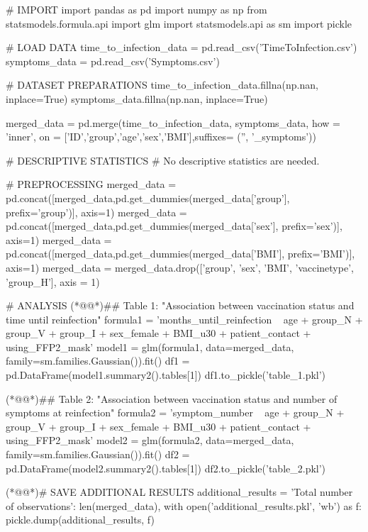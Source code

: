 \documentclass[11pt]{article}
\begin{document}
\begin{python}

# IMPORT
import pandas as pd
import numpy as np
from statsmodels.formula.api import glm
import statsmodels.api as sm
import pickle

# LOAD DATA
time_to_infection_data = pd.read_csv('TimeToInfection.csv')
symptoms_data = pd.read_csv('Symptoms.csv')

# DATASET PREPARATIONS
time_to_infection_data.fillna(np.nan, inplace=True)
symptoms_data.fillna(np.nan, inplace=True)

merged_data = pd.merge(time_to_infection_data, symptoms_data, how = 'inner', on = ['ID','group','age','sex','BMI'],suffixes= ('', '_symptoms'))

# DESCRIPTIVE STATISTICS
# No descriptive statistics are needed.

# PREPROCESSING
merged_data = pd.concat([merged_data,pd.get_dummies(merged_data['group'], prefix='group')], axis=1)
merged_data = pd.concat([merged_data,pd.get_dummies(merged_data['sex'], prefix='sex')], axis=1)
merged_data = pd.concat([merged_data,pd.get_dummies(merged_data['BMI'], prefix='BMI')], axis=1)
merged_data = merged_data.drop(['group', 'sex', 'BMI', 'vaccinetype', 'group_H'], axis = 1)

# ANALYSIS
(*@@*)## Table 1: "Association between vaccination status and time until reinfection"
formula1 = 'months_until_reinfection ~ age + group_N + group_V + group_I + sex_female + BMI_u30 + patient_contact + using_FFP2_mask'
model1 = glm(formula1, data=merged_data, family=sm.families.Gaussian()).fit()
df1 = pd.DataFrame(model1.summary2().tables[1])
df1.to_pickle('table_1.pkl')

(*@@*)## Table 2: "Association between vaccination status and number of symptoms at reinfection"
formula2 = 'symptom_number ~ age + group_N + group_V + group_I + sex_female + BMI_u30 + patient_contact + using_FFP2_mask'
model2 = glm(formula2, data=merged_data, family=sm.families.Gaussian()).fit()
df2 = pd.DataFrame(model2.summary2().tables[1])
df2.to_pickle('table_2.pkl')

(*@@*)# SAVE ADDITIONAL RESULTS
additional_results = {
    'Total number of observations': len(merged_data),         
}
with open('additional_results.pkl', 'wb') as f:
    pickle.dump(additional_results, f)


\end{python}
\end{document}
